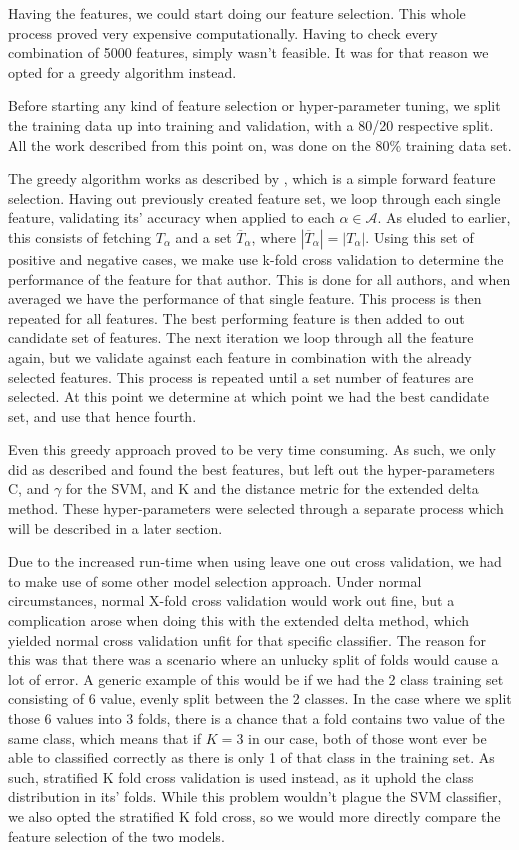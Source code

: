 Having the features, we could start doing our feature selection. This whole
process proved very expensive computationally. Having to check every combination
of 5000 features, simply wasn't feasible. It was for that reason we opted for a
greedy algorithm instead.

Before starting any kind of feature selection or hyper-parameter tuning,
we split the training data up into training and validation, with a 
80/20 respective split. All the work described from this point on,
was done on the 80\% training data set.

The greedy algorithm works as described by \cite{kanDeng}, which is a simple
forward feature selection. Having out previously created feature set, we loop
through each single feature, validating its' accuracy when applied to each
$\alpha \in \mathcal{A}$. As eluded to earlier, this consists of fetching
$T_{\alpha}$ and a set $\overline{T}_{\alpha}$, where $|\overline{T}_\alpha| =
|T_\alpha|$. Using this set of positive and negative cases, we make use k-fold
cross validation to determine the performance of the feature for that author.
This is done for all authors, and when averaged we have the performance of
that single feature. This process is then repeated for all features. The best
performing feature is then added to out candidate set of features. The next
iteration we loop through all the feature again, but we validate against each
feature in combination with the already selected features. This process is
repeated until a set number of features are selected. At this point we determine
at which point we had the best candidate set, and use that hence fourth.

Even this greedy approach proved to be very time consuming. As such, we only did
as described and found the best features, but left out the hyper-parameters C,
and $\gamma$ for the SVM, and K and the distance metric for the extended delta
method. These hyper-parameters were selected through a separate process
which will be described in a later section.

Due to the increased run-time when using leave one out cross validation,
we had to make use of some other model selection approach. Under normal
circumstances, normal X-fold cross validation would work out fine, but a complication
arose when doing this with the extended delta method, which yielded normal
cross validation unfit for that specific classifier.
The reason for this was that there was a scenario where an unlucky split of
folds would cause a lot of error. A generic example of this would be if we
had the 2 class training set consisting of 6 value, evenly split between the
2 classes. In the case where we split those 6 values into 3 folds, there is a
chance that a fold contains two value of the same class, which means that if $K
= 3$ in our case, both of those wont ever be able to classified correctly as
there is only 1 of that class in the training set. As such, stratified K fold
cross validation is used instead, as it uphold the class distribution in its'
folds. While this problem wouldn't plague the SVM classifier, we also opted 
the stratified K fold cross, so we would more directly compare the feature selection
of the two models.

